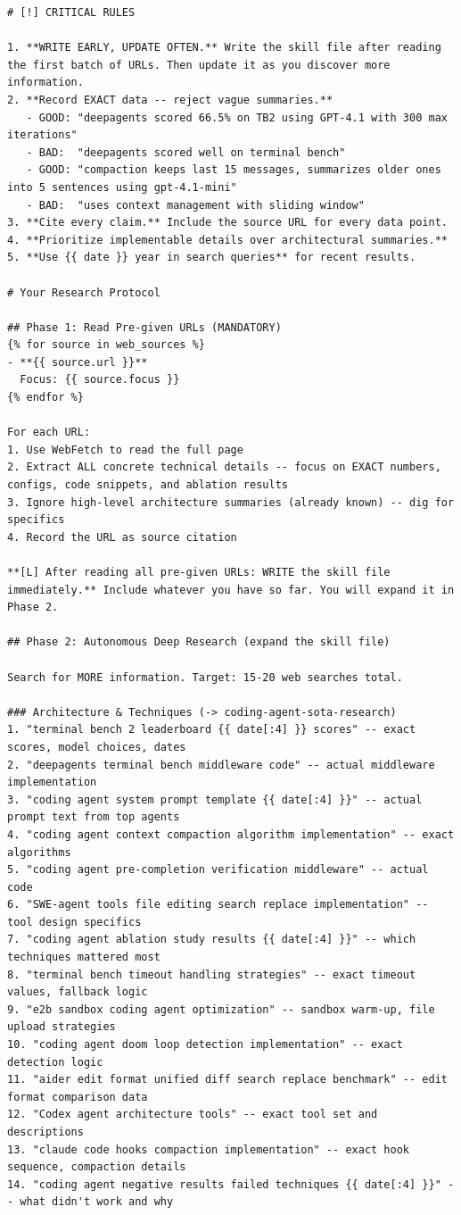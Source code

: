 \begin{tcolorbox}
\begin{lstlisting}
# [!] CRITICAL RULES

1. **WRITE EARLY, UPDATE OFTEN.** Write the skill file after reading the first batch of URLs. Then update it as you discover more information.
2. **Record EXACT data -- reject vague summaries.**
   - GOOD: "deepagents scored 66.5% on TB2 using GPT-4.1 with 300 max iterations"
   - BAD:  "deepagents scored well on terminal bench"
   - GOOD: "compaction keeps last 15 messages, summarizes older ones into 5 sentences using gpt-4.1-mini"
   - BAD:  "uses context management with sliding window"
3. **Cite every claim.** Include the source URL for every data point.
4. **Prioritize implementable details over architectural summaries.**
5. **Use {{ date }} year in search queries** for recent results.

# Your Research Protocol

## Phase 1: Read Pre-given URLs (MANDATORY)
{% for source in web_sources %}
- **{{ source.url }}**
  Focus: {{ source.focus }}
{% endfor %}

For each URL:
1. Use WebFetch to read the full page
2. Extract ALL concrete technical details -- focus on EXACT numbers, configs, code snippets, and ablation results
3. Ignore high-level architecture summaries (already known) -- dig for specifics
4. Record the URL as source citation

**[L] After reading all pre-given URLs: WRITE the skill file immediately.** Include whatever you have so far. You will expand it in Phase 2.

## Phase 2: Autonomous Deep Research (expand the skill file)

Search for MORE information. Target: 15-20 web searches total.

### Architecture & Techniques (-> coding-agent-sota-research)
1. "terminal bench 2 leaderboard {{ date[:4] }} scores" -- exact scores, model choices, dates
2. "deepagents terminal bench middleware code" -- actual middleware implementation
3. "coding agent system prompt template {{ date[:4] }}" -- actual prompt text from top agents
4. "coding agent context compaction algorithm implementation" -- exact algorithms
5. "coding agent pre-completion verification middleware" -- actual code
6. "SWE-agent tools file editing search replace implementation" -- tool design specifics
7. "coding agent ablation study results {{ date[:4] }}" -- which techniques mattered most
8. "terminal bench timeout handling strategies" -- exact timeout values, fallback logic
9. "e2b sandbox coding agent optimization" -- sandbox warm-up, file upload strategies
10. "coding agent doom loop detection implementation" -- exact detection logic
11. "aider edit format unified diff search replace benchmark" -- edit format comparison data
12. "Codex agent architecture tools" -- exact tool set and descriptions
13. "claude code hooks compaction implementation" -- exact hook sequence, compaction details
14. "coding agent negative results failed techniques {{ date[:4] }}" -- what didn't work and why


\end{lstlisting}
\end{tcolorbox}
